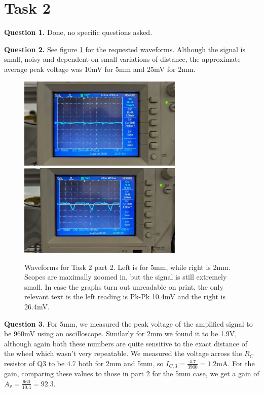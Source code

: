 \documentclass[letterpaper, reqno,11pt]{article}
\begin{document}
\section{Task 2}

{\medskip\noindent\bf Question 1.} Done, no specific questions asked.

{\medskip\noindent\bf Question 2.} See figure \ref{fig:q2} for the requested waveforms. Although the signal is small, noisy and dependent on small variations of distance, the approximate average peak voltage was 10mV for 5mm and 25mV for 2mm.

\begin{figure}[htpb]
    \centering
    \includegraphics[width=0.7\textwidth]{q2-5}
    \includegraphics[width=0.7\textwidth]{q2-2}
    \caption{Waveforms for Task 2 part 2. Left is for 5mm, while right is 2mm. Scopes are maximally zoomed in, but the signal is still extremely small. In case the graphs turn out unreadable on print, the only relevant text is the left reading is Pk-Pk 10.4mV and the right is 26.4mV.}
    \label{fig:q2}
\end{figure}


{\medskip\noindent\bf Question 3.} For 5mm, we measured the peak voltage of the amplified signal to be 960mV using an oscilloscope. Similarly for $2$mm we found it to be 1.9V, although again both these numbers are quite sensitive to the exact distance of the wheel which wasn't very repeatable. We measured the voltage across the $R_C$ resistor of Q3 to be $4.7$ both for 2mm and 5mm, so $I_{C,3}=\frac{4.7}{3900}=1.2$mA. For the gain, comparing these values to those in part 2 for the 5mm case, we get a gain of $A_v= \frac{960}{10.4}=92.3$.
\end{document}
